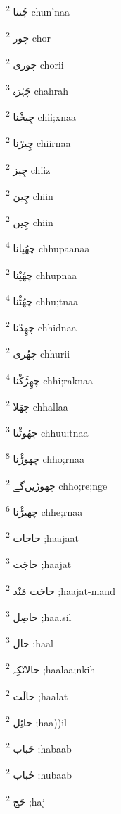 \documentclass[12pt]{article}
\begin{document}
\begin{multicols}{5}
{\ur چُننا}   \textsuperscript{2} chun'naa

{\ur چور}   \textsuperscript{2} chor

{\ur چوری}   \textsuperscript{2} chorii

{\ur چَہْرَہ}   \textsuperscript{3} chahrah

{\ur چِیخْنا}   \textsuperscript{2} chii;xnaa

{\ur چِیرْنا}   \textsuperscript{2} chiirnaa

{\ur چِیز}   \textsuperscript{2} chiiz

{\ur چِین}   \textsuperscript{2} chiin

{\ur چِین}   \textsuperscript{2} chiin

{\ur چھُپانا}   \textsuperscript{4} chhupaanaa

{\ur چھُپْنا}   \textsuperscript{2} chhupnaa

{\ur چھُٹْنا}   \textsuperscript{4} chhu;tnaa

{\ur چھِدْنا}   \textsuperscript{2} chhidnaa

{\ur چھُری}   \textsuperscript{2} chhurii

{\ur چھِڑَکْنا}   \textsuperscript{4} chhi;raknaa

{\ur چھَلا}   \textsuperscript{2} chhallaa

{\ur چھُوٹْنا}   \textsuperscript{3} chhuu;tnaa

{\ur چھوڑْنا}   \textsuperscript{8} chho;rnaa

{\ur چھوڑیں‌گے}   \textsuperscript{2} chho;re;nge

{\ur چھیڑْنا}   \textsuperscript{6} chhe;rnaa

{\ur حاجات}   \textsuperscript{2} ;haajaat

{\ur حاجَت}   \textsuperscript{3} ;haajat

{\ur حاجَت مَنْد}   \textsuperscript{2} ;haajat-mand

{\ur حاصِل}   \textsuperscript{3} ;haa.sil

{\ur حال}   \textsuperscript{3} ;haal

{\ur حالانْکِہ}   \textsuperscript{2} ;haalaa;nkih

{\ur حالَت}   \textsuperscript{2} ;haalat

{\ur حائِل}   \textsuperscript{2} ;haa))il

{\ur حَباب}   \textsuperscript{2} ;habaab

{\ur حُباب}   \textsuperscript{2} ;hubaab

{\ur حَج}   \textsuperscript{2} ;haj


\end{multicols}
\end{document}
